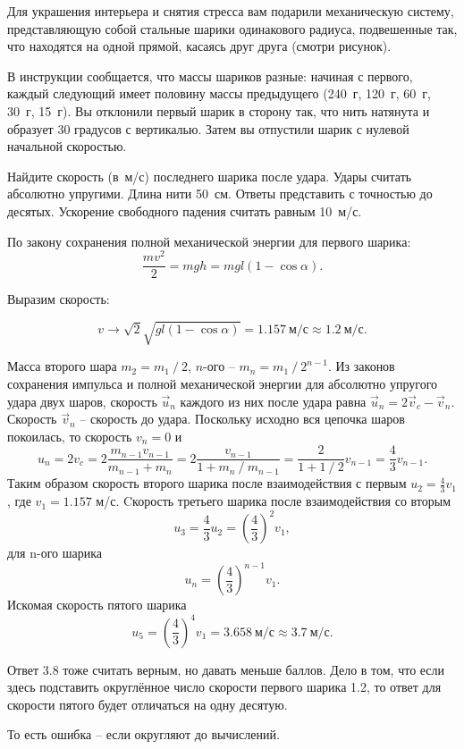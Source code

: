 
Для украшения интерьера и снятия стресса вам подарили механическую систему, 
представляющую собой стальные шарики одинакового радиуса, подвешенные так, что 
находятся на одной прямой, касаясь друг друга (смотри рисунок).


В инструкции сообщается, что массы шариков разные: начиная с первого, каждый следующий имеет 
половину массы предыдущего (240~г, 120~г, 60~г, 30~г, 15~г). Вы отклонили первый шарик в сторону так, 
что нить натянута и образует 30 градусов с вертикалью. Затем вы отпустили шарик с 
нулевой начальной скоростью.

Найдите скорость (в~м/с) последнего шарика после удара. Удары считать абсолютно упругими. Длина нити 50~см. 
Ответы представить с точностью до десятых. Ускорение свободного падения считать равным 10~м/с.

\solutionSection

По закону сохранения полной механической энергии для первого шарика:
$$\frac{mv^2}{2} = mgh = mgl (1 - \cos \alpha).$$

Выразим скорость:

$$v \rightarrow \sqrt{2} \sqrt{g l (1 - \cos \alpha)} = 1.157 \: \text{м/с} \approx 1.2 \: \text{м/с}.$$

Масса второго шара $m_2=m_1⁄2$, $n$-ого – $m_n=m_1⁄2^{n-1}$. Из законов сохранения импульса и 
полной механической энергии для абсолютно упругого удара двух шаров, скорость $\overrightarrow{u}_n $ 
каждого из них после удара равна $\overrightarrow{u}_n=2 \overrightarrow{v}_c- \overrightarrow{v}_n$. 
Скорость $\overrightarrow{v}_n$ – скорость до удара. Поскольку исходно вся цепочка шаров покоилась, 
то скорость $v_n=0$ и
$$u_n=2v_c=2 \frac{m_{n-1} v_{n-1}}{m_{n-1}+m_n}=2 \frac{v_{n-1}}{1+m_n⁄m_{n-1}}=\frac{2}{1+1⁄2} v_{n-1}=\frac{4}{3} v_{n-1}.$$
Таким образом скорость второго шарика после взаимодействия с первым $u_2=\frac{4}{3} v_1$, где $v_1=1.157$ м/с. 
Cкорость третьего шарика после взаимодействия со вторым 
$$u_3=\frac{4}{3} u_2=\left(\frac{4}{3}\right)^2 v_1,$$
для n-ого шарика
$$u_n=\left(\frac{4}{3}\right)^{n-1}v_1.$$
Искомая скорость пятого шарика
$$u_5=\left(\frac{4}{3}\right)^4 v_1=3.658 \: \text{м/с} \approx 3.7 \: \text{м/с}.$$

Ответ 3.8 тоже считать верным, но давать меньше баллов. Дело в том, что если здесь подставить округлённое число скорости первого шарика 1.2, то ответ для скорости пятого будет отличаться на одну десятую. 

То есть ошибка – если округляют до вычислений.

